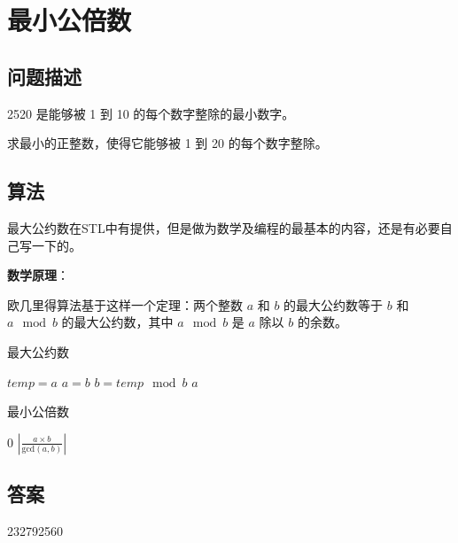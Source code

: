 \section{最小公倍数}\label{sec:problem05}
\subsection{问题描述}
\begin{tcolorbox}
	2520 是能够被 1 到 10 的每个数字整除的最小数字。

	求最小的正整数，使得它能够被 1 到 20 的每个数字整除。
\end{tcolorbox}

\subsection{算法}
最大公约数在STL中有提供，但是做为数学及编程的最基本的内容，还是有必要自己写一下的。

\textbf{数学原理}：

欧几里得算法基于这样一个定理：两个整数  $ a $  和  $ b $  的最大公约数等于  $b$  和 \( a \mod b \) 的最大公约数，其中 \(
a \mod b \) 是  $a$  除以  $b$  的余数。

\begin{algorithm}
	\caption{最大公约数}
	\begin{algorithmic}[1]
		\State $ temp = a$
		\State $ a = b$
		\State $ b = temp \mod b$
		\EndWhile
		\Return $a$
		\EndFunction
	\end{algorithmic}
\end{algorithm}

\begin{algorithm}
	\caption{最小公倍数}
	\begin{algorithmic}[1]
				\Return $0$
			\EndIf
			\Return $\left|\frac{a \times b}{\text{gcd}(a,b)}\right|$
		\EndFunction
	\end{algorithmic}
\end{algorithm}

\subsection{答案}
232792560
